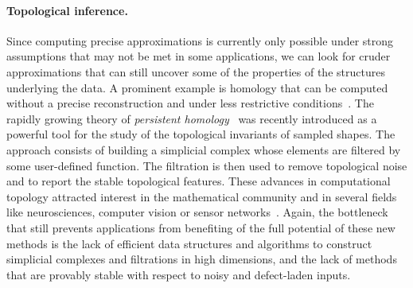 \paragraph{Topological inference.}
Since computing precise approximations is currently only possible under strong assumptions that may not be met in some applications, we can look for cruder approximations 
that can still  uncover some of the properties of the structures underlying the data.
%
%
A prominent example is homology that can be computed  without a precise reconstruction and under less restrictive conditions~\cite{geometrica-ccl09,nsw-fhm-2008}. The rapidly growing theory of {\em persistent homology}~\cite{eh-ph-2008,rg-bptd-2008} was recently introduced as a powerful tool for the study of the topological invariants of sampled shapes. The approach consists of building a simplicial complex whose elements are filtered by some user-defined function. The filtration is then used to remove topological noise and to report the stable topological features.  These advances in computational topology attracted interest in the mathematical community and in several fields like neurosciences, computer vision or sensor networks~\cite{cids-lbsni-2008,rg-bptd-2008}. Again, the bottleneck that still prevents applications from benefiting of the full potential of these new methods is the lack of efficient data structures and algorithms to construct simplicial complexes and filtrations in high dimensions, and the lack of methods that are provably stable with respect to  noisy and defect-laden inputs.


